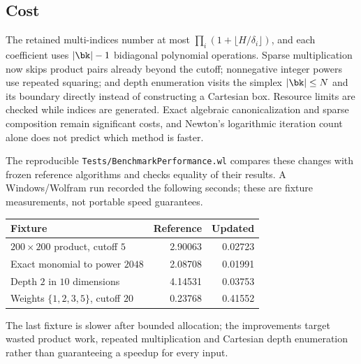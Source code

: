 \subsection{Cost}

The retained multi-indices number at most $\prod_i(1+\lfloor H/\delta_i\rfloor)$, and each coefficient uses $|\bk|-1$ bidiagonal polynomial operations. Sparse multiplication now skips product pairs already beyond the cutoff; nonnegative integer powers use repeated squaring; and depth enumeration visits the simplex $|\bk|\le N$ and its boundary directly instead of constructing a Cartesian box. Resource limits are checked while indices are generated. Exact algebraic canonicalization and sparse composition remain significant costs, and Newton's logarithmic iteration count alone does not predict which method is faster.

The reproducible \texttt{Tests/BenchmarkPerformance.wl} compares these changes with frozen reference algorithms and checks equality of their results. A Windows/Wolfram run recorded the following seconds; these are fixture measurements, not portable speed guarantees.
\begin{center}
\begin{tabular}{@{}lrr@{}}
\toprule
Fixture & Reference & Updated\\
\midrule
$200\times200$ product, cutoff $5$ & 2.90063 & 0.02723\\
Exact monomial to power $2048$ & 2.08708 & 0.01991\\
Depth $2$ in $10$ dimensions & 4.14531 & 0.03753\\
Weights $\{1,2,3,5\}$, cutoff $20$ & 0.23768 & 0.41552\\
\bottomrule
\end{tabular}
\end{center}
The last fixture is slower after bounded allocation; the improvements target wasted product work, repeated multiplication and Cartesian depth enumeration rather than guaranteeing a speedup for every input.
